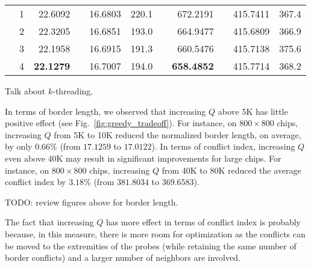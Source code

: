 \begin{table}[p!]
{\begin{tabular*}{\hsize}{crrrrrlrrrr}
                &     1   &      22.6092  &      &      16.6803  & 220.1 &  &      672.2191  &      &      415.7411  & 367.4 \\
                &     2   &      22.3205  &      &      16.6851  & 193.0 &  &      664.9477  &      &      415.6809  & 366.9 \\
                &     3   &      22.1958  &      &      16.6915  & 191.3 &  &      660.5476  &      &      415.7138  & 375.6 \\
                &     4   & {\bf 22.1279} &      &      16.7007  & 194.0 &  & {\bf 658.4852} &      &      415.7714  & 368.2 \\
\hline
\end{tabular*}}
\end{table}

Talk about $k$-threading.

In terms of border length, we observed that increasing $Q$ above 5K has little
positive effect (see Fig.~\ref{fig:greedy_tradeoff}). For instance, on
$800\times 800$ chips, increasing $Q$ from 5K to 10K reduced the normalized
border length, on average, by only $0.66\%$ (from $17.1259$ to $17.0122$). In
terms of conflict index, increasing $Q$ even above 40K may result in significant
improvements for large chips. For instance, on $800\times 800$ chips, increasing
$Q$ from 40K to 80K reduced the average conflict index by $3.18\%$ (from
$381.8034$ to $369.6583$).

TODO: review figures above for border length.

The fact that increasing $Q$ has more effect in terms of conflict index is
probably because, in this measure, there is more room for optimization as the
conflicts can be moved to the extremities of the probes (while retaining the
same number of border conflicts) and a larger number of neighbors are involved.


